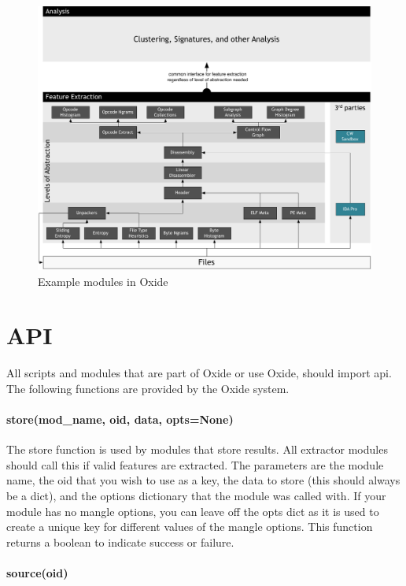 \documentclass{book}
\begin{document}
\begin{figure}
\centering
\includegraphics[width=1.2\textwidth]{pdf/modules.pdf}
\caption{Example modules in Oxide}
\label{oxide-modules}
\end{figure}


\chapter{API}
All scripts and modules that are part of Oxide or use Oxide, should import api.  The following functions are provided by the Oxide system.

\subsubsection{store(mod\_name, oid, data, opts=None)}

The store function is used by modules that store results.  All extractor modules should call this if valid features are extracted.  The parameters are the module name, the oid that you wish to use as a key, the data to store (this should always be a dict), and the options dictionary that the module was called with.  If your module has no mangle options, you can leave off the opts dict as it is used to create a unique key for different values of the mangle options.  This function returns a boolean to indicate success or failure.

\subsubsection{source(oid)}
\end{document}
